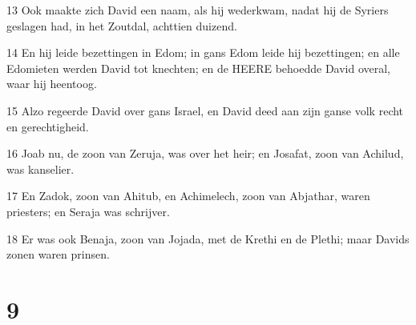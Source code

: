 \par 13 Ook maakte zich David een naam, als hij wederkwam, nadat hij de Syriers geslagen had, in het Zoutdal, achttien duizend.
\par 14 En hij leide bezettingen in Edom; in gans Edom leide hij bezettingen; en alle Edomieten werden David tot knechten; en de HEERE behoedde David overal, waar hij heentoog.
\par 15 Alzo regeerde David over gans Israel, en David deed aan zijn ganse volk recht en gerechtigheid.
\par 16 Joab nu, de zoon van Zeruja, was over het heir; en Josafat, zoon van Achilud, was kanselier.
\par 17 En Zadok, zoon van Ahitub, en Achimelech, zoon van Abjathar, waren priesters; en Seraja was schrijver.
\par 18 Er was ook Benaja, zoon van Jojada, met de Krethi en de Plethi; maar Davids zonen waren prinsen.

\chapter{9}

